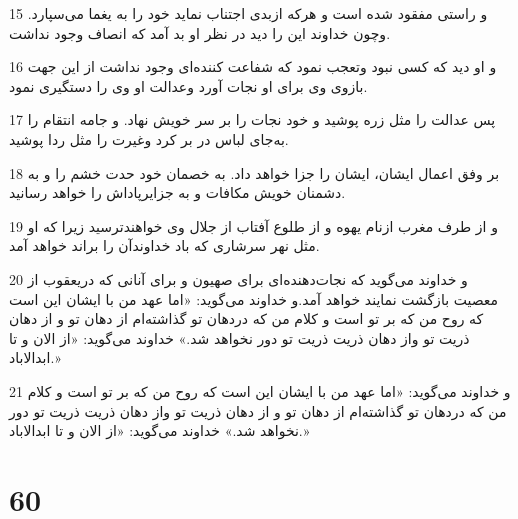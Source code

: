 \par 15 و راستی مفقود شده است و هر‌که ازبدی اجتناب نماید خود را به یغما می‌سپارد. وچون خداوند این را دید در نظر او بد آمد که انصاف وجود نداشت.
\par 16 و او دید که کسی نبود وتعجب نمود که شفاعت کننده‌ای وجود نداشت از این جهت بازوی وی برای او نجات آورد وعدالت او وی را دستگیری نمود.
\par 17 پس عدالت را مثل زره پوشید و خود نجات را بر سر خویش نهاد. و جامه انتقام را به‌جای لباس در بر کرد وغیرت را مثل ردا پوشید.
\par 18 بر وفق اعمال ایشان، ایشان را جزا خواهد داد. به خصمان خود حدت خشم را و به دشمنان خویش مکافات و به جزایرپاداش را خواهد رسانید.
\par 19 و از طرف مغرب ازنام یهوه و از طلوع آفتاب از جلال وی خواهندترسید زیرا که او مثل نهر سرشاری که باد خداوندآن را براند خواهد آمد.
\par 20 و خداوند می‌گوید که نجات‌دهنده‌ای برای صهیون و برای آنانی که دریعقوب از معصیت بازگشت نمایند خواهد آمد.و خداوند می‌گوید: «اما عهد من با ایشان این است که روح من که بر تو است و کلام من که دردهان تو گذاشته‌ام از دهان تو و از دهان ذریت تو واز دهان ذریت ذریت تو دور نخواهد شد.» خداوند می‌گوید: «از الان و تا ابدالاباد.»
\par 21 و خداوند می‌گوید: «اما عهد من با ایشان این است که روح من که بر تو است و کلام من که دردهان تو گذاشته‌ام از دهان تو و از دهان ذریت تو واز دهان ذریت ذریت تو دور نخواهد شد.» خداوند می‌گوید: «از الان و تا ابدالاباد.»
 
\chapter{60}

